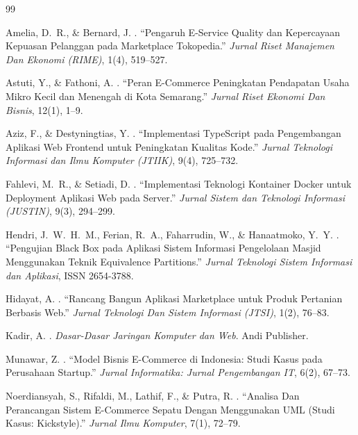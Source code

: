 \documentclass[12pt,a4paper,twocolumn]{article}
\begin{document}
\begin{thebibliography}{99}

Amelia, D.~R., \& Bernard, J.
.
\newblock ``Pengaruh E-Service Quality dan Kepercayaan Kepuasan Pelanggan pada Marketplace Tokopedia.''
\newblock \emph{Jurnal Riset Manajemen Dan Ekonomi (RIME)}, 1(4), 519--527.

Astuti, Y., \& Fathoni, A.
.
\newblock ``Peran E-Commerce Peningkatan Pendapatan Usaha Mikro Kecil dan Menengah di Kota Semarang.''
\newblock \emph{Jurnal Riset Ekonomi Dan Bisnis}, 12(1), 1--9.

Aziz, F., \& Destyningtias, Y.
.
\newblock ``Implementasi TypeScript pada Pengembangan Aplikasi Web Frontend untuk Peningkatan Kualitas Kode.''
\newblock \emph{Jurnal Teknologi Informasi dan Ilmu Komputer (JTIIK)}, 9(4), 725--732.

Fahlevi, M.~R., \& Setiadi, D.
.
\newblock ``Implementasi Teknologi Kontainer Docker untuk Deployment Aplikasi Web pada Server.''
\newblock \emph{Jurnal Sistem dan Teknologi Informasi (JUSTIN)}, 9(3), 294--299.

Hendri, J.~W.~H.~M., Ferian, R.~A., Faharrudin, W., \& Hanaatmoko, Y.~Y.
.
\newblock ``Pengujian Black Box pada Aplikasi Sistem Informasi Pengelolaan Masjid Menggunakan Teknik Equivalence Partitions.''
\newblock \emph{Jurnal Teknologi Sistem Informasi dan Aplikasi}, ISSN 2654-3788.

Hidayat, A.
.
\newblock ``Rancang Bangun Aplikasi Marketplace untuk Produk Pertanian Berbasis Web.''
\newblock \emph{Jurnal Teknologi Dan Sistem Informasi (JTSI)}, 1(2), 76--83.

Kadir, A.
.
\newblock \emph{Dasar-Dasar Jaringan Komputer dan Web}.
\newblock Andi Publisher.

Munawar, Z.
.
\newblock ``Model Bisnis E-Commerce di Indonesia: Studi Kasus pada Perusahaan Startup.''
\newblock \emph{Jurnal Informatika: Jurnal Pengembangan IT}, 6(2), 67--73.

Noerdiansyah, S., Rifaldi, M., Lathif, F., \& Putra, R.
.
\newblock ``Analisa Dan Perancangan Sistem E-Commerce Sepatu Dengan Menggunakan UML (Studi Kasus: Kickstyle).''
\newblock \emph{Jurnal Ilmu Komputer}, 7(1), 72--79.


\end{thebibliography}
\end{document}
